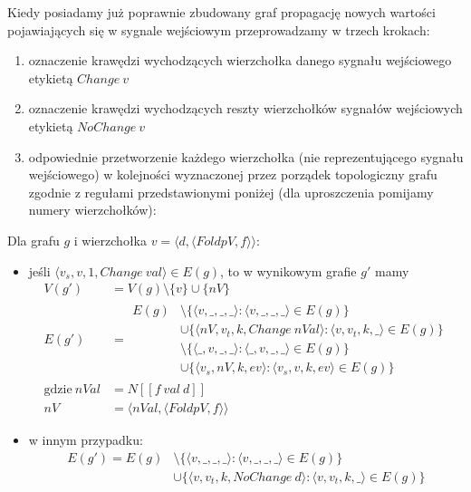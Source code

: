 \documentclass[11pt,leqno]{article}
\begin{document}
Kiedy posiadamy już poprawnie zbudowany graf propagację nowych wartości pojawiających się w sygnale wejściowym przeprowadzamy w trzech krokach:
\begin{enumerate}
\item oznaczenie krawędzi wychodzących wierzchołka danego sygnału wejściowego etykietą $Change\:v$
\item oznaczenie krawędzi wychodzących reszty wierzchołków sygnałów wejściowych etykietą $NoChange\:v$ 
\item odpowiednie przetworzenie każdego wierzchołka (nie reprezentującego sygnału wejściowego) w kolejności wyznaczonej przez porządek topologiczny grafu zgodnie z regułami przedstawionymi poniżej (dla uproszczenia pomijamy numery wierzchołków):
\end{enumerate}
\newpage
Dla grafu $g$ i wierzchołka $v = \langle d, \langle FoldpV,f \rangle \rangle$:
\begin{itemize}
\item jeśli $ \langle v_s , v, 1, Change\:val \rangle \in E(g) $, to w wynikowym grafie $g'$ mamy
\begin {align*}
V(g') &= V(g) \setminus \{ v \} \cup \{ nV \} \\
E(g') &= \begin{aligned} E(g) &\setminus \{ \langle v, \_, \_, \_ \rangle : \langle v, \_ , \_, \_ \rangle \in E(g) \} \\ 
&\cup \{ \langle nV, v_t, k, Change\: nVal \rangle : \langle v, v_t , k, \_ \rangle \in E(g) \} \\
&\setminus \{ \langle \_, v, \_, \_ \rangle : \langle \_, v, \_, \_ \rangle \in E(g) \} \\
&\cup \{ \langle v_s, nV, k, ev \rangle : \langle v_s, v, k, ev \rangle \in E(g) \} \end{aligned} \\
\text{gdzie} \: nVal &= N [\![f \: val \: d]\!] \\
nV &= \langle nVal , \langle FoldpV,f \rangle \rangle
\end{align*}
\item w innym przypadku:
\begin{align*}
E(g') = E(g) &\setminus \{ \langle v, \_, \_, \_ \rangle : \langle v, \_, \_, \_ \rangle \in E(g) \} \\ 
&\cup \{ \langle v, v_t, k, NoChange\: d \rangle : \langle v, v_t , k, \_ \rangle \in E(g) \}
\end{align*}
\end{itemize}
\end{document}

